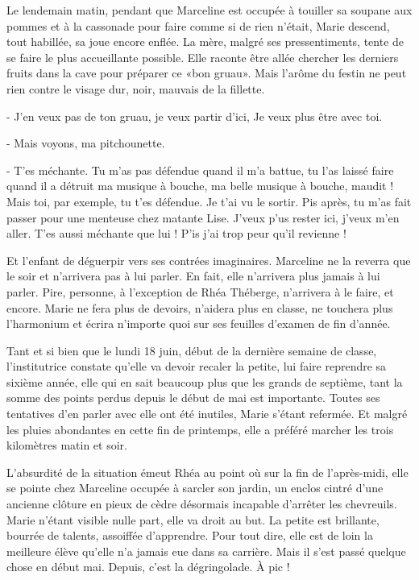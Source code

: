 Le lendemain matin, pendant que Marceline est occupée à touiller sa soupane aux pommes et à la cassonade pour faire comme si de rien n’était, Marie descend, tout habillée, sa joue encore enflée. La mère, malgré ses pressentiments, tente de se faire le plus accueillante possible. Elle raconte être allée chercher les derniers fruits dans la cave pour préparer ce «bon gruau». Mais l’arôme du festin ne peut rien contre le visage dur, noir, mauvais de la fillette.

- J’en veux pas de ton gruau, je veux partir d’ici, Je veux plus être avec toi.

- Mais voyons, ma pitchounette.

- T’es méchante. Tu m’as pas défendue quand il m’a battue, tu l’as laissé faire quand il a détruit ma musique à bouche, ma belle musique à bouche, maudit ! Mais toi, par exemple, tu t’es défendue. Je t’ai vu le sortir. Pis après, tu m’as fait passer pour une menteuse chez matante Lise. J’veux p’us rester ici, j’veux m’en aller. T’es aussi méchante que lui ! P’is j’ai trop peur qu’il revienne !

Et l’enfant de déguerpir vers ses contrées imaginaires. Marceline ne la reverra que le soir et n’arrivera pas à lui parler. En fait, elle n’arrivera plus jamais à lui parler. Pire, personne, à l’exception de Rhéa Théberge, n’arrivera à le faire, et encore. Marie ne fera plus de devoirs, n’aidera plus en classe, ne touchera plus l’harmonium et écrira n’importe quoi sur ses feuilles d’examen de fin d’année.

Tant et si bien que le lundi 18 juin, début de la dernière semaine de classe, l’institutrice constate qu’elle va devoir recaler la petite, lui faire reprendre sa sixième année, elle qui en sait beaucoup plus que les grands de septième, tant la somme des points perdus depuis le début de mai est importante. Toutes ses tentatives d’en parler avec elle ont été inutiles, Marie s’étant refermée. Et malgré les pluies abondantes en cette fin de printemps, elle a préféré marcher les trois kilomètres matin et soir.

L’absurdité de la situation émeut Rhéa au point où sur la fin de l’après-midi, elle se pointe chez Marceline occupée à sarcler son jardin, un enclos cintré d’une ancienne clôture en pieux de cèdre désormais incapable d’arrêter les chevreuils. Marie n’étant visible nulle part, elle va droit au but. La petite est brillante, bourrée de talents, assoiffée d’apprendre. Pour tout dire, elle est de loin la meilleure élève qu’elle n’a jamais eue dans sa carrière. Mais il s’est passé quelque chose en début mai. Depuis, c’est la dégringolade. À pic !

